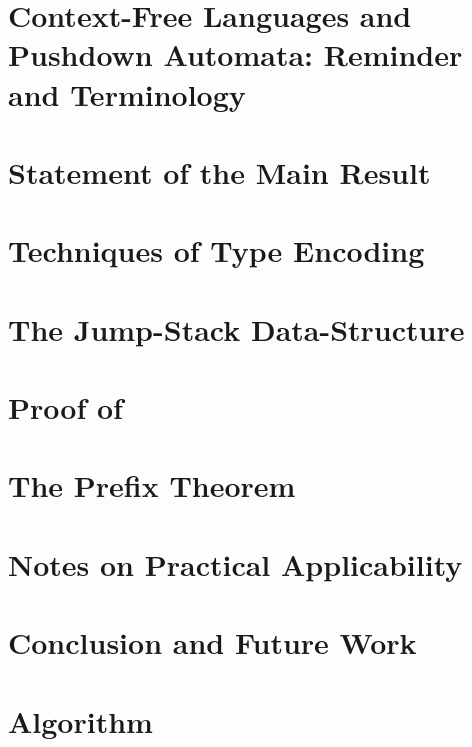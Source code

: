 \documentclass[a4paper,USenglish]{lipics}
\begin{document}
\section{Context-Free Languages and Pushdown Automata: Reminder and Terminology}
\label{Section:pushdown}


\section{Statement of the Main Result} 
\label{Section:result}


\section{Techniques of Type Encoding}
\label{Section:toolkit}


\section{The Jump-Stack Data-Structure}
\label{Section:jump}


\section{Proof of }
\label{Section:proof}


\section{The Prefix Theorem}
\label{Section:prefix}


\section{Notes on Practical Applicability}
\label{Section:applicability}


\section{Conclusion and Future Work}
\label{Section:zz}




\small
	

\clearpage
\appendix
\section{Algorithm}

\end{document}
